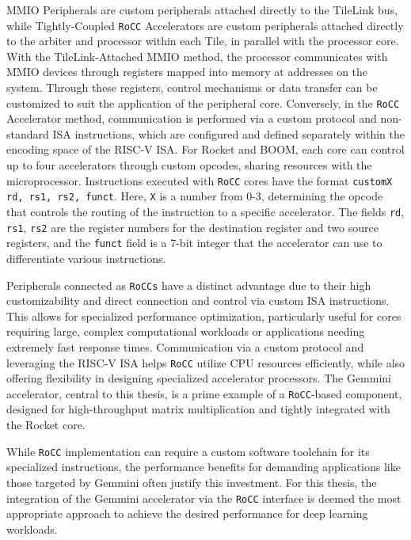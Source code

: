 MMIO Peripherals are custom peripherals attached directly to the TileLink bus, while Tightly-Coupled \texttt{RoCC} Accelerators are custom peripherals attached directly to the arbiter and processor within each Tile, in parallel with the processor core. With the TileLink-Attached MMIO method, the processor communicates with MMIO devices through registers mapped into memory at addresses on the system. Through these registers, control mechanisms or data transfer can be customized to suit the application of the peripheral core. Conversely, in the \texttt{RoCC} Accelerator method, communication is performed via a custom protocol and non-standard ISA instructions, which are configured and defined separately within the encoding space of the RISC-V ISA. For Rocket and BOOM, each core can control up to four accelerators through custom opcodes, sharing resources with the microprocessor. Instructions executed with \texttt{RoCC} cores have the format \texttt{customX rd, rs1, rs2, funct}. Here, \texttt{X} is a number from 0-3, determining the opcode that controls the routing of the instruction to a specific accelerator. The fields \texttt{rd}, \texttt{rs1}, \texttt{rs2} are the register numbers for the destination register and two source registers, and the \texttt{funct} field is a 7-bit integer that the accelerator can use to differentiate various instructions.

Peripherals connected as \texttt{RoCCs} have a distinct advantage due to their high customizability and direct connection and control via custom ISA instructions. This allows for specialized performance optimization, particularly useful for cores requiring large, complex computational workloads or applications needing extremely fast response times. Communication via a custom protocol and leveraging the RISC-V ISA helps \texttt{RoCC} utilize CPU resources efficiently, while also offering flexibility in designing specialized accelerator processors. The Gemmini accelerator, central to this thesis, is a prime example of a \texttt{RoCC}-based component, designed for high-throughput matrix multiplication and tightly integrated with the Rocket core.

While \texttt{RoCC} implementation can require a custom software toolchain for its specialized instructions, the performance benefits for demanding applications like those targeted by Gemmini often justify this investment. For this thesis, the integration of the Gemmini accelerator via the \texttt{RoCC} interface is deemed the most appropriate approach to achieve the desired performance for deep learning workloads.

